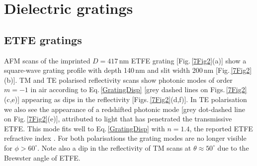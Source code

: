 \section{Dielectric gratings}
\subsection{ETFE gratings}
AFM scans of the imprinted $D=417$\,nm ETFE grating [Fig.\,\ref{7Fig2}(a)] show a square-wave grating profile with depth 140\,nm and slit width 200\,nm [Fig.\,\ref{7Fig2}(b)]. TM and TE polarised reflectivity scans show photonic modes of order $m=-1$ in air according to Eq.\,\ref{GratingDisp} [grey dashed lines on Figs.\,\ref{7Fig2}(c,e)] appearing as dips in the reflectivity [Figs.\,\ref{7Fig2}(d,f)]. In TE polarisation we also see the appearance of a redshifted photonic mode [grey dot-dashed line on Fig.\,\ref{7Fig2}(e)], attributed to light that has penetrated the transmissive ETFE. This mode fits well to Eq.\,\ref{GratingDisp} with $n=1.4$, the reported ETFE refractive index \cite{French2011}. For both polarisations the grating modes are no longer visible for $\phi>60^{\circ}$. Note also a dip in the reflectivity of TM scans at $\theta\approx50^{\circ}$ due to the Brewster angle of ETFE.

